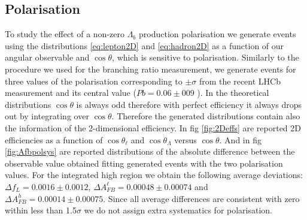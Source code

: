 \subsection{Polarisation}

To study the effect of a non-zero $\Lambda_b$ production polarisation we generate events using the distributions \ref{eq:lepton2D} and \ref{eq:hadron2D} as a function of our angular observable and $\cos\theta$, which is sensitive to polarisation.
Similarly to the procedure we used for the branching ratio measurement, we generate events for three values of the polarisation corresponding to $\pm \sigma$ from the recent LHCb measurement and its central value ($Pb = 0.06 \pm 009$ \cite{Aaij:2013oxa}).
In the theoretical distributions $\cos \theta$ is always odd therefore with perfect efficiency it always drops out by integrating over $\cos\theta$.
Therefore the generated distributions contain also the information of the 2-dimensional efficiency. In fig \ref{fig:2Deffs} are reported 2D efficiencies as a function of $\cos \theta_\ell$ and $\cos \theta_\Lambda$ versus $\cos \theta$. And in fig \ref{fig:Afbpolsys} are reported distributions of the absolute difference between the observable value obtained fitting generated events with the two polarisation values. 
For the integrated high \qsq region we obtain the following average deviations: $\Delta f_L = 0.0016 \pm 0.0012$, $\Delta A_{FB}^\ell = 0.00048 \pm 0.00074$ and $\Delta A_{FB}^h = 0.00014 \pm 0.00075$.
Since all average differences are consistent with zero within less than 1.5$\sigma$ we do not assign extra systematics for polarisation.

